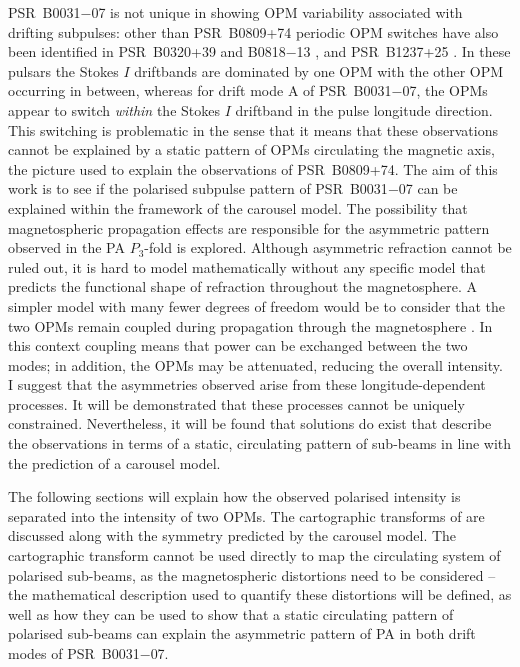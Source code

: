 PSR~B0031$-$07 is not unique in showing OPM variability associated with drifting subpulses: other than PSR~B0809+74 \citep{ESxx2004,RRL+2006} periodic OPM switches have also been identified in PSR~B0320+39 and B0818$-$13 \citep{ESxx2004}, and PSR~B1237+25 \citep{RRxx2003}. In these pulsars the Stokes $I$ driftbands are dominated by one OPM with the other OPM occurring in between, whereas for drift mode A of PSR~B0031$-$07, the OPMs appear to switch {\it within} the Stokes $I$ driftband in the pulse longitude direction. This switching is problematic in the sense that it means that these observations cannot be explained by a static pattern of OPMs circulating the magnetic axis, the picture used to explain the observations of PSR~B0809+74. The aim of this work is to see if the polarised subpulse pattern of PSR~B0031$-$07 can be explained within the framework of the carousel model. The possibility that magnetospheric propagation effects are responsible for the asymmetric pattern observed in the PA $P_3$-fold is explored. Although asymmetric refraction cannot be ruled out, it is hard to model mathematically without any specific model that predicts the functional shape of refraction throughout the magnetosphere. A simpler model with many fewer degrees of freedom would be to consider that the two OPMs remain coupled during propagation through the magnetosphere \citep[e.g.][]{Pxxx2001}. In this context coupling means that power can be exchanged between the two modes; in addition, the OPMs may be attenuated, reducing the overall intensity. I suggest that the asymmetries observed arise from these longitude-dependent processes. It will be demonstrated that these processes cannot be uniquely constrained. Nevertheless, it will be found that solutions do exist that describe the observations in terms of a static, circulating pattern of sub-beams in line with the prediction of a carousel model.

The following sections will explain how the observed polarised intensity is separated into the intensity of two OPMs. The cartographic transforms of \citet{DRxx2001} are discussed along with the symmetry predicted by the carousel model. The cartographic transform cannot be used directly to map the circulating system of polarised sub-beams, as the magnetospheric distortions need to be considered -- the mathematical description used to quantify these distortions will be defined, as well as how they can be used to show that a static circulating pattern of polarised sub-beams can explain the asymmetric pattern of PA in both drift modes of PSR~B0031$-$07.



